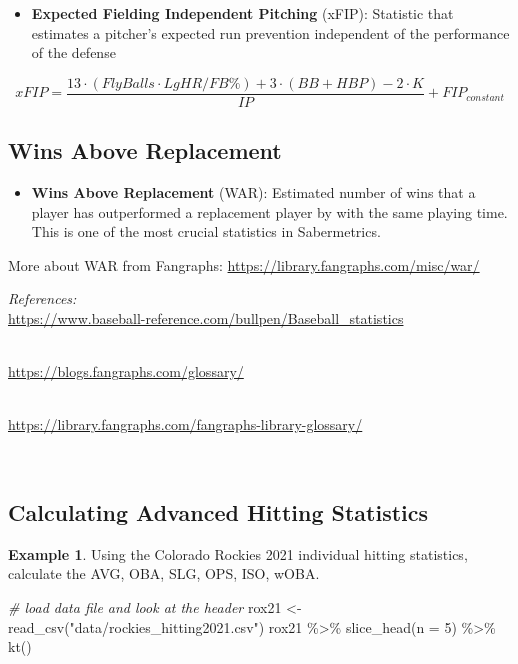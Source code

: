 \documentclass[
  11pt,
]{book}
\newenvironment{Shaded}{\begin{snugshade}}{\end{snugshade}}
\newcommand{\AttributeTok}[1]{\textcolor[rgb]{0.77,0.63,0.00}{#1}}
\newcommand{\CommentTok}[1]{\textcolor[rgb]{0.56,0.35,0.01}{\textit{#1}}}
\newcommand{\DecValTok}[1]{\textcolor[rgb]{0.00,0.00,0.81}{#1}}
\newcommand{\FunctionTok}[1]{\textcolor[rgb]{0.00,0.00,0.00}{#1}}
\newcommand{\NormalTok}[1]{#1}
\newcommand{\OtherTok}[1]{\textcolor[rgb]{0.56,0.35,0.01}{#1}}
\newcommand{\SpecialCharTok}[1]{\textcolor[rgb]{0.00,0.00,0.00}{#1}}
\newcommand{\StringTok}[1]{\textcolor[rgb]{0.31,0.60,0.02}{#1}}
\providecommand{\tightlist}{%
  \setlength{\itemsep}{0pt}\setlength{\parskip}{0pt}}
\theoremstyle{definition}
\theoremstyle{definition}
\newtheorem{example}{Example}[chapter]
\theoremstyle{definition}
\theoremstyle{definition}
\theoremstyle{remark}
\begin{document}
\begin{itemize}
\tightlist
\item
  \textbf{Expected Fielding Independent Pitching} (xFIP): Statistic that estimates a pitcher's expected run prevention independent of the performance of the defense
\end{itemize}

\[xFIP = \frac{13 \cdot (Fly Balls \cdot LgHR/FB\%)+3 \cdot (BB + HBP) - 2 \cdot K}{IP} + FIP_{constant}\]

\hypertarget{wins-above-replacement}{%
\subsection{Wins Above Replacement}\label{wins-above-replacement}}

\begin{itemize}
\tightlist
\item
  \textbf{Wins Above Replacement} (WAR): Estimated number of wins that a player has outperformed a replacement player by with the same playing time. This is one of the most crucial statistics in Sabermetrics.
\end{itemize}

More about WAR from Fangraphs: \url{https://library.fangraphs.com/misc/war/}

\emph{References:}\\
\url{https://www.baseball-reference.com/bullpen/Baseball_statistics}\strut \\
\url{https://blogs.fangraphs.com/glossary/}\strut \\
\url{https://library.fangraphs.com/fangraphs-library-glossary/}\strut \\

\newpage

\hypertarget{calculating-advanced-hitting-statistics}{%
\subsection{Calculating Advanced Hitting Statistics}\label{calculating-advanced-hitting-statistics}}

\begin{example}
Using the Colorado Rockies 2021 individual hitting statistics, calculate the AVG, OBA, SLG, OPS, ISO, wOBA.
\end{example}

\begin{Shaded}
\begin{Highlighting}[]
\CommentTok{\# load data file and look at the header}
\NormalTok{rox21 }\OtherTok{\textless{}{-}} \FunctionTok{read\_csv}\NormalTok{(}\StringTok{"data/rockies\_hitting2021.csv"}\NormalTok{)}
\NormalTok{rox21 }\SpecialCharTok{\%\textgreater{}\%}
    \FunctionTok{slice\_head}\NormalTok{(}\AttributeTok{n =} \DecValTok{5}\NormalTok{) }\SpecialCharTok{\%\textgreater{}\%}
    \FunctionTok{kt}\NormalTok{()}
\end{Highlighting}
\end{Shaded}
\end{document}

